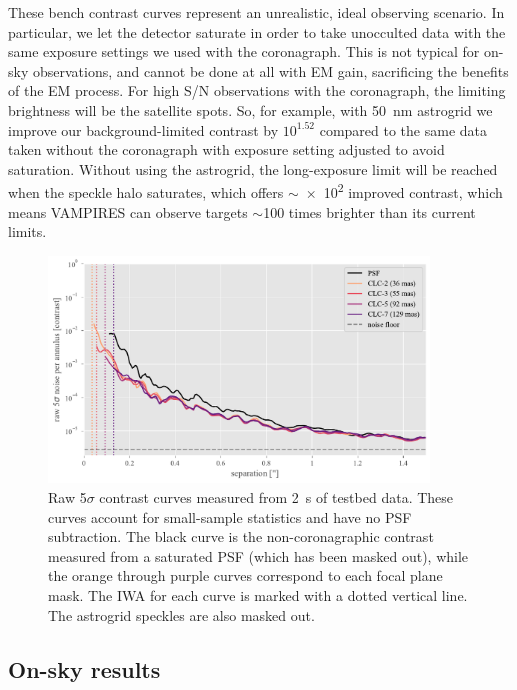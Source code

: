 \documentclass[]{spie}  %
\begin{document}
These bench contrast curves represent an unrealistic, ideal observing scenario. In particular, we let the detector saturate in order to take unocculted data with the same exposure settings we used with the coronagraph. This is not typical for on-sky observations, and cannot be done at all with EM gain, sacrificing the benefits of the EM process. For high S/N observations with the coronagraph, the limiting brightness will be the satellite spots. So, for example, with \qty{50}{\nano\meter} astrogrid we improve our background-limited contrast by $10^{1.52}$ compared to the same data taken without the coronagraph with exposure setting adjusted to avoid saturation. Without using the astrogrid, the long-exposure limit will be reached when the speckle halo saturates, which offers $\sim$\num{e2} improved contrast, which means VAMPIRES can observe targets $\sim$100 times brighter than its current limits.

\begin{figure}
   \centering
   \includegraphics[width=0.9\textwidth]{figures/saturated_bench_20220628_curves}
   \caption{Raw 5$\sigma$ contrast curves measured from \qty{2}{\second} of testbed data. These curves account for small-sample statistics and have no PSF subtraction. The black curve is the non-coronagraphic contrast measured from a saturated PSF (which has been masked out), while the orange through purple curves correspond to each focal plane mask. The IWA for each curve is marked with a dotted vertical line. The astrogrid speckles are also masked out.}\label{fig:contrast}
\end{figure}

\subsection{On-sky results}\label{sec:onsky}
\end{document}

